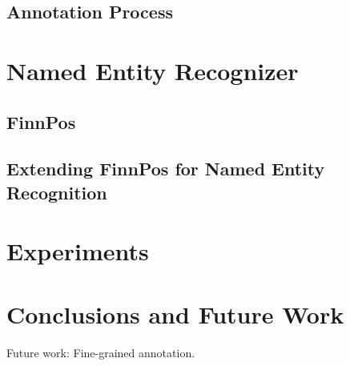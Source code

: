 \documentclass[11pt]{article}
\begin{document}



\subsection{Annotation Process}





\section{Named Entity Recognizer}
\label{sec: named entity recognizer}


\subsection{FinnPos}



\subsection{Extending FinnPos for Named Entity Recognition}




\section{Experiments}
\label{sec: experiments}




\section{Conclusions and Future Work}
\label{sec: conclusions}


Future work: Fine-grained annotation.



\newpage

%

\end{document}
